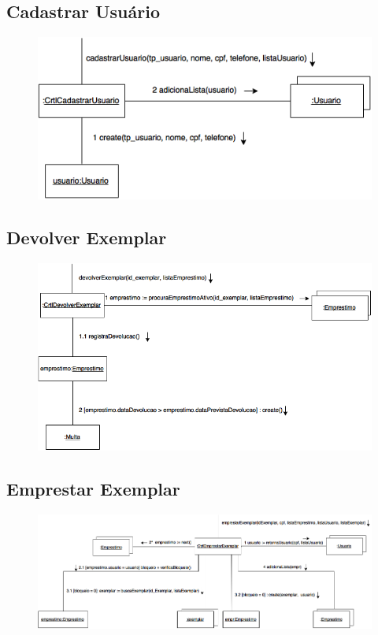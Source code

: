 \documentclass[
	12pt,				%
	openright,			%
	oneside,			%
	a4paper,			%
	english,			%
	brazil				%
	]{abntex2}
\begin{document}
\subsection{Cadastrar Usuário}

\begin{figure}[H]
\includegraphics[width=1\textwidth]{CadastrarUsuario}
\label{fig:figura4}
\end{figure}

\subsection{Devolver Exemplar}

\begin{figure}[H]
\includegraphics[width=1\textwidth]{DevolverExemplar}
\label{fig:figura5}
\end{figure}

\subsection{Emprestar Exemplar}

\begin{figure}[H]
\includegraphics[width=1\textwidth]{EmprestarExemplar}
\label{fig:figura6}
\end{figure}
\end{document}
